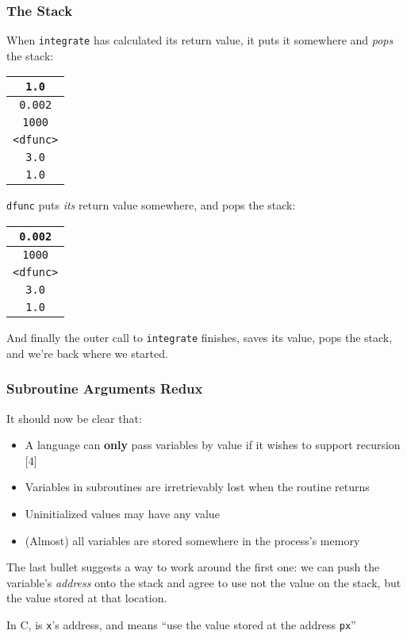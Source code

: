 \documentclass[10pt, t]{beamer}
\begin{document}
\begin{frame}
\frametitle{The Stack}
\label{sec-5_1_9}


When \texttt{integrate} has calculated its return value, it puts it somewhere 
and \emph{pops} the stack:


\begin{center}
\begin{tabular}{|c|}
\hline
 \texttt{1.0}      \\
\hline
\hline
 \texttt{0.002}    \\
\hline
 \texttt{1000}     \\
\hline
 \texttt{<dfunc>}  \\
\hline
 \texttt{3.0}      \\
\hline
 \texttt{1.0}      \\
\hline
\hline
\end{tabular}
\end{center}



\pause

\texttt{dfunc} puts \emph{its} return value somewhere, and pops the stack:


\begin{center}
\begin{tabular}{|c|}
\hline
 \texttt{0.002}    \\
\hline
 \texttt{1000}     \\
\hline
 \texttt{<dfunc>}  \\
\hline
 \texttt{3.0}      \\
\hline
 \texttt{1.0}      \\
\hline
\hline
\end{tabular}
\end{center}



\pause 

And finally the outer call to \texttt{integrate} finishes, saves its value, pops the stack, and we're
back where we started.
\end{frame}
\begin{frame}
\frametitle{Subroutine Arguments Redux}
\label{sec-5_1_10}

It should now be clear that:

\begin{itemize}
\item A language can \textbf{only} pass variables by value if it wishes to support recursion
 [4]
\item Variables in subroutines are irretrievably lost when the routine returns
\item Uninitialized values may have any value
\item (Almost) all variables are stored somewhere in the process's memory
\end{itemize}

\pause The last bullet suggests a way to work around the first one: we can push the variable's \emph{address} onto
the stack and agree to use not the value on the stack, but the value stored at that location.

\pause
In C,  is \texttt{x}'s address, and  means ``use the value stored at the address \texttt{px}''
\end{frame}
\end{document}
